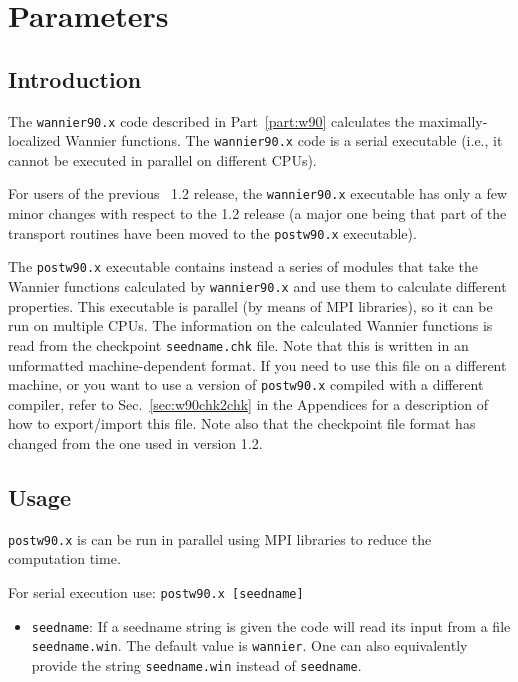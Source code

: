 \chapter{Parameters}

\section{Introduction}
The \texttt{wannier90.x} code described in Part~\ref{part:w90}
calculates the maximally-localized Wannier functions. The \texttt{wannier90.x} code is a
serial executable (i.e., it cannot be executed in parallel on different
CPUs).

For users of the previous \wannier\ 1.2 release, the
\texttt{wannier90.x} executable has only a few minor changes with
respect to the 1.2 release (a major one being that part of the
transport routines have been moved to the \texttt{postw90.x}
executable).

The \texttt{postw90.x} executable contains instead a series of modules
that take the Wannier functions calculated by \texttt{wannier90.x} and
use them to calculate different properties.  This executable is
parallel (by means of MPI libraries), so it can be run on multiple
CPUs.  The information on the calculated Wannier functions is read
from the checkpoint \verb|seedname.chk| file. Note that this is
written in an unformatted machine-dependent format. If you need to use
this file on a different machine, or you want to use a version of
\texttt{postw90.x} compiled with a different compiler, refer to
Sec.~\ref{sec:w90chk2chk} in the Appendices for a description of how
to export/import this file. Note also that the checkpoint file format has
changed from the one used in version 1.2.

\section{Usage}
{\tt postw90.x} is can be run in parallel using MPI libraries to
reduce the computation time.

For serial execution use: {\tt postw90.x [seedname]} 

\begin{itemize} \item 
{\tt seedname}: If a seedname string is given the code
will read its input from a file {\tt seedname.win}. The default
  value is {\tt wannier}. One can also equivalently provide the string
  {\tt seedname.win} instead of  {\tt seedname}.
\end{itemize}

